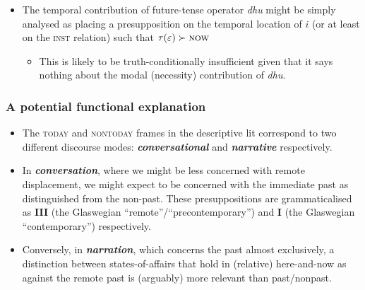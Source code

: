 \documentclass[11pt,dvipsnames]{article}
\begin{document}
\begin{itemize}
	\item The temporal contribution of future-tense operator \textit{dhu} might be simply analysed as placing a presupposition on the temporal location of $ i $ (or at least on the \textsc{inst} relation) such that $ \tau(\varepsilon)\succ \textsc{now} $
	\begin{itemize}
		\item This is likely to be truth-conditionally insufficient given that it says nothing about the modal (necessity) contribution of \textit{dhu}.
	\end{itemize}
	
\end{itemize}

\subsubsection*{A potential functional explanation}
\begin{itemize}
	
	\item The \textsc{today} and \textsc{nontoday} frames in the descriptive lit correspond to two different discourse modes: \textbf{\textit{conversational}} and \textbf{\textit{narrative}} respectively.
	\item  In \textbf{\textit{conversation}}, where we might be less concerned with remote displacement, we might expect to be concerned with the immediate past as distinguished from the non-past. These presuppositions are grammaticalised as \textbf{III} (the Glaswegian ``remote''/``precontemporary'') and \textbf{I} (the Glaswegian ``contemporary'') respectively.
	\item  Conversely, in \textbf{\textit{narration}}, which concerns the past almost exclusively, a distinction between states-of-affairs that hold in (relative) here-and-now as against the remote past is (arguably) more relevant than past/nonpast.
\end{itemize}
\end{document}
